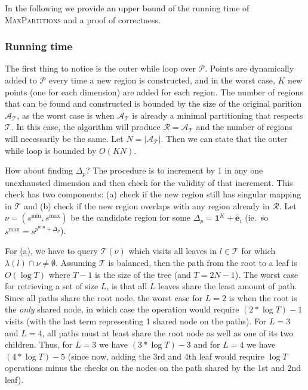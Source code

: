 In the following we provide an upper bound of the running time of
\textsc{MaxPartitions} and a proof of correctness.

\subsubsection{Running time}%
\label{sec:runningTime}

The first thing to notice is the outer while loop over $\mathcal{P}$. Points are
dynamically added to $\mathcal{P}$ every time a new region is constructed, and
in the worst case, $K$ new points (one for each dimension) are added for each
region. The number of regions that can be found and constructed is bounded by
the size of the original parition $\mathcal{A}_{\mathcal{T}}$, as the worst case
is when $\mathcal{A}_{\mathcal{T}}$ is already a minimal partitioning that
respects $\mathcal{T}$. In this case, the algorithm will produce $\mathcal{R} =
\mathcal{A}_{\mathcal{T}}$ and the number of regions will necessarily be the
same. Let $N = |\mathcal{A}_{\mathcal{T}}|$. Then we can state that the outer
while loop is bounded by $O(KN)$.


How about finding $\Delta_{p}$? The procedure is to increment by 1 in any one
unexhausted dimension and then check for the validity of that increment. This
check has two components: (a) check if the new region still has singular mapping
in $\mathcal{T}$ and (b) check if the new region overlaps with any region
already in $\mathcal{R}$. Let $\nu = (s^{\min}, s^{\max})$ be the candidate
region for some $\Delta_{p} = \mathbf{1}^{K} + \mathbf{\hat{e}}_{i}$ (ie.\ so
$s^{\max} = s^{p^{\min} + \Delta_{p}}$).

For (a), we have to query $\mathcal{T}(\nu)$ which visits all leaves in $l \in
\mathcal{T}$ for which $\lambda(l) \cap \nu \neq \emptyset$. Assuming
$\mathcal{T}$ is balanced, then the path from the root to a leaf is $O(\log
 T)$ where $T - 1$ is the size of the tree (and $T = 2N -1$). The worst case
for retrieving a set of size $L$, is that all $L$ leaves share the least amount
of path. Since all paths share the root node, the worst case for $L=2$ is when
the root is the \textit{only} shared node, in which case the operation would
require $(2 * \log T) - 1$ visits (with the last term representing 1 shared
node on the paths). For $L=3$ and $L=4$, all paths must at least share the root
node as well as one of its two children. Thus, for $L=3$ we have $(3 * \log T)
- 3$ and for $L=4$ we have $(4 * \log T) - 5$ (since now, adding the 3rd and
4th leaf would require $\log T$ operations minus the checks on the nodes on the
path shared by the 1st and 2nd leaf).


